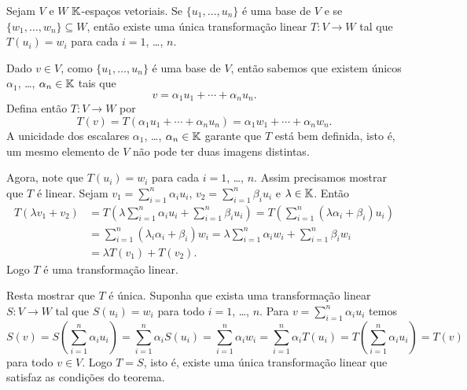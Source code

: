 \begin{teorema}\label{existencia_de_transformacao_unica_dado_valores}
  Sejam $V$ e $W$ $\mathbb{K}$-espa\c{c}os vetoriais. Se $\{u_1, \dots, u_n\}$ \'e uma base de $V$ e se $\{w_1, \dots, w_n\} \subseteq W$, ent\~ao existe uma \'unica transforma\c{c}\~ao linear $T \colon V \to W$ tal que $T(u_i) = w_i$ para cada $i = 1$, \dots, $n$.
\end{teorema}
\begin{prova}
  Dado $v \in V$, como $\{u_1, \dots, u_n\}$ \'e uma base de $V$, ent\~ao sabemos que existem \'unicos $\alpha_1$, \dots, $\alpha_n \in \mathbb{K}$ tais que
  \[
    v = \alpha_1u_1 + \cdots + \alpha_nu_n.
  \]
  Defina ent\~ao $T \colon V \to W$ por
  \[
    T(v) = T(\alpha_1u_1 + \cdots + \alpha_nu_n) = \alpha_1w_1 + \cdots + \alpha_nw_n.
  \]
  A unicidade dos escalares $\alpha_1$, \dots, $\alpha_n \in \mathbb{K}$ garante que $T$ est\'a bem definida, isto \'e, um mesmo elemento de $V$ n\~ao pode ter duas imagens distintas.

  Agora, note que $T(u_i) = w_i$ para cada $i = 1$, \dots, $n$. Assim precisamos mostrar que $T$ \'e linear. Sejam $v_1 = \sum_{i=1}^n\alpha_iu_i$, $v_2 = \sum_{i=1}^n\beta_iu_i$ e $\lambda \in \mathbb{K}$. Ent\~ao
  \begin{align*}
    T(\lambda v_1 + v_2) &= T(\lambda\sum_{i=1}^n\alpha_iu_i + \sum_{i=1}^n\beta_iu_i) = T(\sum_{i=1}^n(\lambda\alpha_i + \beta_i)u_i) \\ &= \sum_{i=1}^n(\lambda_i\alpha_i + \beta_i)w_i = \lambda\sum_{i=1}^n\alpha_iw_i + \sum_{i=1}^n\beta_iw_i \\ &= \lambda T(v_1) + T(v_2).
  \end{align*}
  Logo $T$ \'e uma transforma\c{c}\~ao linear.

  Resta mostrar que $T$ \'e \'unica. Suponha que exista uma transforma\c{c}\~ao linear $S : V \to W$ tal que $S(u_i) = w_i$ para todo $i = 1$, \dots, $n$. Para $v = \sum_{i=1}^n\alpha_iu_i$ temos
  \[
    S(v) = S(\sum_{i=1}^n\alpha_iu_i) = \sum_{i=1}^n\alpha_iS(u_i) = \sum_{i=1}^n\alpha_iw_i = \sum_{i=1}^n\alpha_iT(u_i) = T(\sum_{i=1}^n\alpha_iu_i) = T(v)
  \]
  para todo $v \in V$. Logo $T=S$, isto \'e, existe uma \'unica transforma\c{c}\~ao linear que satisfaz as condi\c{c}\~oes do teorema.
\end{prova}

